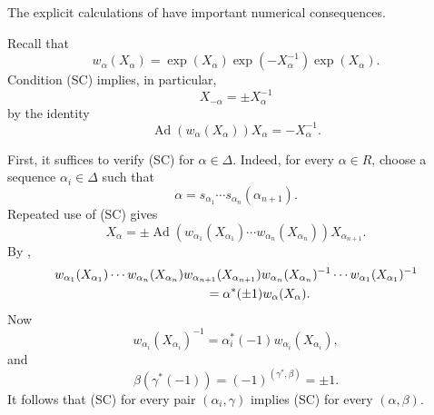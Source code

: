 

The explicit calculations of  have important numerical
consequences.


Recall that
\[
  w_\alpha(X_\alpha)
    =\exp(X_\alpha)\exp(-X_\alpha^{-1})\exp(X_\alpha).
\]
Condition (SC) implies, in particular,
\[
  X_{-\alpha}=\pm X_\alpha^{-1}
\]
by the identity
\[
  \operatorname{Ad}(w_\alpha(X_\alpha))X_\alpha=-X_\alpha^{-1}.
\]


First, it suffices to verify (SC) for \(\alpha\in\Delta\). Indeed,
for every \(\alpha\in R\), choose a sequence
\(\alpha_i\in\Delta\) such that
\[
  \alpha=s_{\alpha_1}\cdots s_{\alpha_n}(\alpha_{n+1}).
\]
Repeated use of (SC) gives
\[
 X_\alpha
  =\pm\operatorname{Ad}\!\left(
    w_{\alpha_1}(X_{\alpha_1})\cdots
    w_{\alpha_n}(X_{\alpha_n})\right)X_{\alpha_{n+1}}.
\]
By ,
\[
\begin{aligned}
 &w_{\alpha_1}(X_{\alpha_1})\cdots w_{\alpha_n}(X_{\alpha_n})
  w_{\alpha_{n+1}}(X_{\alpha_{n+1}})
  w_{\alpha_n}(X_{\alpha_n})^{-1}\cdots
  w_{\alpha_1}(X_{\alpha_1})^{-1}\\
 &\hspace{42mm}=\alpha^*(\pm1)w_\alpha(X_\alpha).
\end{aligned}
\]
Now
\[
 w_{\alpha_i}(X_{\alpha_i})^{-1}
  =\alpha_i^*(-1)w_{\alpha_i}(X_{\alpha_i}),
\]
and
\[
 \beta(\gamma^*(-1))=(-1)^{(\gamma^*,\beta)}=\pm1.
\]
It follows that (SC) for every pair \((\alpha_i,\gamma)\) implies
(SC) for every \((\alpha,\beta)\).

